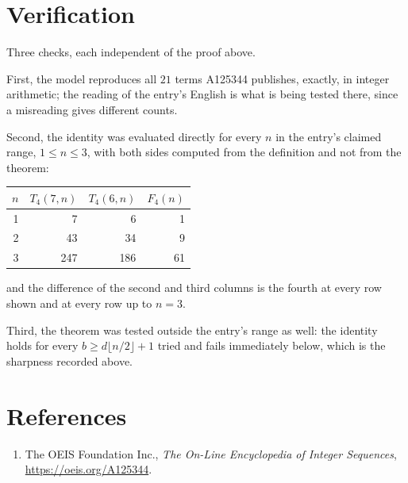 \documentclass[11pt,a4paper]{article}
\theoremstyle{plain}
\theoremstyle{definition}
\begin{document}
\section{Verification}

Three checks, each independent of the proof above.

First, the model reproduces all $21$ terms A125344 publishes, exactly, in integer
arithmetic; the reading of the entry's English is what is being tested there, since a
misreading gives different counts.

Second, the identity was evaluated directly for every $n$ in the entry's claimed range,
$1\le n\le3$, with both sides computed from the definition and not from the theorem:

\begin{center}
\begin{tabular}{rrrr}
$n$ & $T_{4}(7,n)$ & $T_{4}(6,n)$ & $F_{4}(n)$ \\ \hline
1 & 7 & 6 & 1 \\
2 & 43 & 34 & 9 \\
3 & 247 & 186 & 61 \\
\end{tabular}
\end{center}

\noindent and the difference of the second and third columns is the fourth at every row shown
and at every row up to $n=3$.

Third, the theorem was tested outside the entry's range as well: the identity holds for every
$b\ge d\lfloor n/2\rfloor+1$ tried and fails immediately below, which is the sharpness recorded
above.

\section*{References}
\begin{enumerate}
\item The OEIS Foundation Inc., \emph{The On-Line Encyclopedia of Integer Sequences},
\url{https://oeis.org/A125344}.
\end{enumerate}
\end{document}
